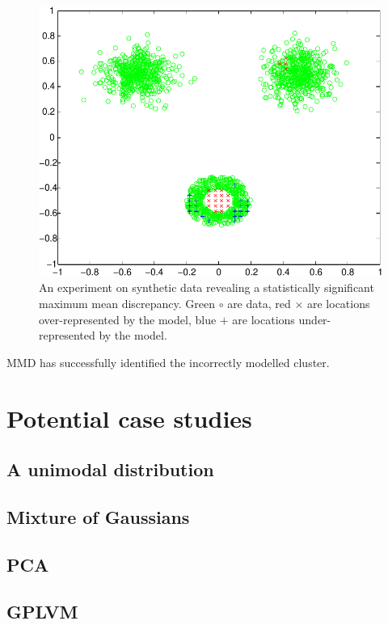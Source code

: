 \documentclass{article}
\begin{document}
\begin{figure}[ht]
\centering
\includegraphics[width=0.98\columnwidth]{figures/blob_blob_ring}
\caption{
An experiment on synthetic data revealing a statistically significant maximum mean discrepancy.
Green $\circ$ are data, red $\times$ are locations over-represented by the model, blue $+$ are locations under-represented by the model.
}
\label{fig:blob_blob_ring}
\end{figure}

MMD has successfully identified the incorrectly modelled cluster.

\section{Potential case studies}

\subsection{A unimodal distribution}

\subsection{Mixture of Gaussians}

\subsection{PCA}

\subsection{GPLVM}
\end{document}
